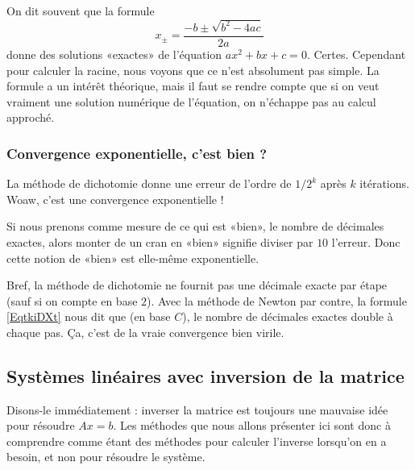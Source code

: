 \begin{remark}
    On dit souvent que la formule
    \begin{equation}
        x_{\pm}=\frac{ -b\pm\sqrt{b^2-4ac} }{ 2a }
    \end{equation}
    donne des solutions «exactes» de l'équation \( ax^2+bx+c=0\). Certes. Cependant pour calculer la racine, nous voyons que ce n'est absolument pas simple. La formule a un intérêt théorique, mais il faut se rendre compte que si on veut vraiment une solution numérique de l'équation, on n'échappe pas au calcul approché.
\end{remark}

\subsubsection{Convergence exponentielle, c'est bien ?}

La méthode de dichotomie donne une erreur de l'ordre de \( 1/2^k\) après \( k\) itérations. Woaw, c'est une convergence exponentielle ! 

Si nous prenons comme mesure de ce qui est «bien», le nombre de décimales exactes, alors monter de un cran en «bien» signifie diviser par \( 10\) l'erreur. Donc cette notion de «bien» est elle-même exponentielle.

Bref, la méthode de dichotomie ne fournit pas une décimale exacte par étape (sauf si on compte en base \( 2\)). Avec la méthode de Newton par contre, la formule \eqref{EqtkiDXt} nous dit que (en base \( C\)), le nombre de décimales exactes double à chaque pas. Ça, c'est de la vraie convergence bien virile.

\subsection{Systèmes linéaires avec inversion de la matrice}

Disons-le immédiatement : inverser la matrice est toujours une mauvaise idée pour résoudre \( Ax=b\). Les méthodes que nous allons présenter ici sont donc à comprendre comme étant des méthodes pour calculer l'inverse lorsqu'on en a besoin, et non pour résoudre le système.

